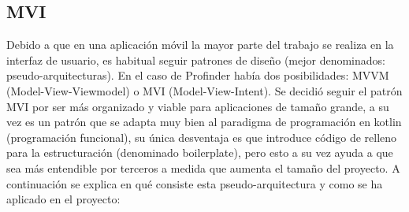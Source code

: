\hypertarget{subsec:mvi}{}
\subsection{MVI}
\label{subsec:mvi}
Debido a que en una aplicación móvil la mayor parte del trabajo se realiza en la interfaz de usuario, es habitual seguir patrones de diseño (mejor denominados: pseudo-arquitecturas). En el caso de Profinder había dos posibilidades: MVVM\hyperlink{cap:biblio}{} (Model-View-Viewmodel) o MVI (Model-View-Intent). Se decidió seguir el patrón MVI por ser más organizado y viable para aplicaciones de tamaño grande, a su vez es un patrón que se adapta muy bien al paradigma de programación en kotlin (programación funcional), su única desventaja es que introduce código de relleno para la estructuración (denominado boilerplate), pero esto a su vez ayuda a que sea más entendible por terceros a medida que aumenta el tamaño del proyecto. A continuación se explica en qué consiste esta pseudo-arquitectura y como se ha aplicado en el proyecto:
